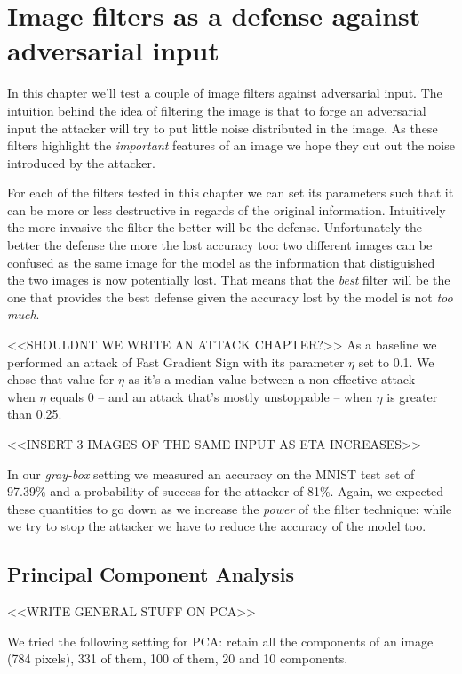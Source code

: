\chapter{Image filters as a defense against adversarial input}

In this chapter we'll test a couple of image filters against
adversarial input. The intuition behind the idea of filtering the image
is that to forge an adversarial input the attacker will try to put
little noise distributed in the image. As these filters highlight the
\emph{important} features of an image we hope they cut out the noise
introduced by the attacker.

For each of the filters tested in this chapter we can set its
parameters such that it can be more or less destructive in regards of
the original information. Intuitively the more invasive the filter the
better will be the defense. Unfortunately the better the defense the
more the lost accuracy too: two different images can be confused as the
same image for the model as the information that distiguished the two
images is now potentially lost. That means that the \emph{best} filter
will be the one that provides the best defense given the accuracy lost
by the model is not \emph{too much}.

<<SHOULDNT WE WRITE AN ATTACK CHAPTER?>> As a baseline we performed an
attack of Fast Gradient Sign with its parameter $\eta$ set to 0.1. We
chose that value for $\eta$ as it's a median value between a
non-effective attack -- when $\eta$ equals 0 -- and an attack that's
mostly unstoppable -- when $\eta$ is greater than 0.25.

<<INSERT 3 IMAGES OF THE SAME INPUT AS ETA INCREASES>>

In our \emph{gray-box} setting we measured an accuracy on the MNIST
test set of 97.39\% and a probability of success for the attacker of
81\%. Again, we expected these quantities to go down as we increase the
\emph{power} of the filter technique: while we try to stop the attacker
we have to reduce the accuracy of the model too.

\section{Principal Component Analysis}

<<WRITE GENERAL STUFF ON PCA>>

We tried the following setting for PCA: retain all the components of an
image (784 pixels), 331 of them, 100 of them, 20 and 10 components.

